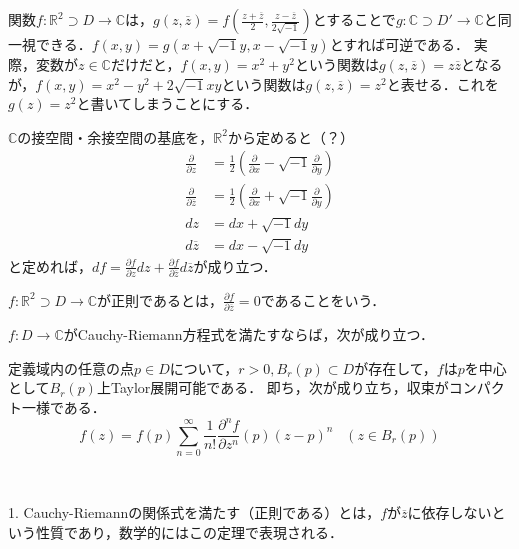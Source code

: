 \documentclass[uplatex, dvipdfmx]{jsreport}
\begin{document}
\begin{example}[謎の複素数の導入]
    関数$f:\mathbb{R}^2\supset D\to\mathbb{C}$は，$g(z,\overline{z})=f\left( \frac{z+\overline{z}}{2} , \frac{z-\overline{z}}{2\sqrt{-1}} \right)$とすることで$g:\mathbb{C}\supset D'\to\mathbb{C}$と同一視できる．$f(x,y)=g(x+\sqrt{-1}y,x-\sqrt{-1}y)$とすれば可逆である．
    実際，変数が$z\in\mathbb{C}$だけだと，$f(x,y)=x^2+y^2$という関数は$g(z,\overline{z})=z\overline{z}$となるが，$f(x,y)=x^2-y^2+2\sqrt{-1}xy$という関数は$g(z,\overline{z})=z^2$と表せる．これを$g(z)=z^2$と書いてしまうことにする．
\end{example}

\begin{definition}
    $\mathbb{C}$の接空間・余接空間の基底を，$\mathbb{R}^2$から定めると（？）
    \begin{align*}
        \frac{\partial}{\partial z} &= \frac{1}{2}\left( \frac{\partial}{\partial x}-\sqrt{-1}\frac{\partial}{\partial y} \right) \\
        \frac{\partial}{\partial \overline{z}} &= \frac{1}{2}\left( \frac{\partial}{\partial x}+\sqrt{-1}\frac{\partial}{\partial y} \right) \\
        dz &= dx + \sqrt{-1}dy \\
        d\overline{z} &= dx - \sqrt{-1}dy
    \end{align*}
    と定めれば，$df=\frac{\partial f}{\partial z}dz+\frac{\partial f}{\partial\overline{z}}d\overline{z}$が成り立つ．
\end{definition}

\begin{definition}
    $f:\mathbb{R}^2\supset D\to\mathbb{C}$が正則であるとは，$\frac{\partial f}{\partial\overline{z}}=0$であることをいう．
\end{definition}
\begin{theorem}[正則ならば解析的]
    $f:D\to\mathbb{C}$がCauchy-Riemann方程式を満たすならば，次が成り立つ．

    定義域内の任意の点$p\in D$について，$r>0,B_r(p)\subset D$が存在して，$f$は$p$を中心として$B_r(p)$上Taylor展開可能である．
    即ち，次が成り立ち，収束がコンパクト一様である．
    \[ f(z) = f(p) \sum^\infty_{n=0} \frac{1}{n!}\frac{\partial^nf}{\partial z^n}(p)(z-p)^n\;\;\; (z\in B_r(p)) \]
\end{theorem}
\begin{remark}　

    1. Cauchy-Riemannの関係式を満たす（正則である）とは，$f$が$\overline{z}$に依存しないという性質であり，数学的にはこの定理で表現される．
\end{remark}
\end{document}

